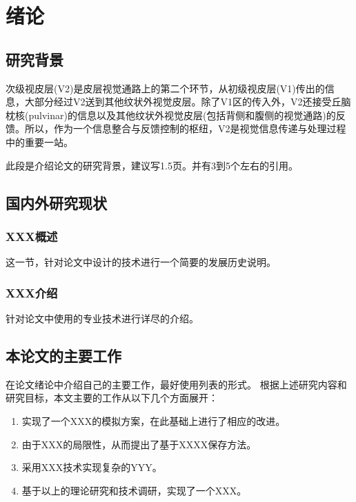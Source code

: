 \chapter{绪论}
\section{研究背景}

次级视皮层(V2)是皮层视觉通路上的第二个环节，从初级视皮层(V1)传出的信息，大部分经过V2送到其他纹状外视觉皮层。除了V1区的传入外，V2还接受丘脑枕核(pulvinar)的信息以及其他纹状外视觉皮层(包括背侧和腹侧的视觉通路)的反馈。所以，作为一个信息整合与反馈控制的枢纽，V2是视觉信息传递与处理过程中的重要一站\cite{01}。

此段是介绍论文的研究背景，建议写1.5页。并有3到5个左右的引用。



\section{国内外研究现状}
\subsection{XXX概述}


这一节，针对论文中设计的技术进行一个简要的发展历史说明。


\subsection{XXX介绍}

针对论文中使用的专业技术进行详尽的介绍。

\section{本论文的主要工作}

在论文绪论中介绍自己的主要工作，最好使用列表的形式。
根据上述研究内容和研究目标，本文主要的工作从以下几个方面展开：
\begin{enumerate}
\item 实现了一个XXX的模拟方案，在此基础上进行了相应的改进。
\item 由于XXX的局限性，从而提出了基于XXXX保存方法。
\item 采用XXX技术实现复杂的YYY。
\item 基于以上的理论研究和技术调研，实现了一个XXX。
\end{enumerate}
